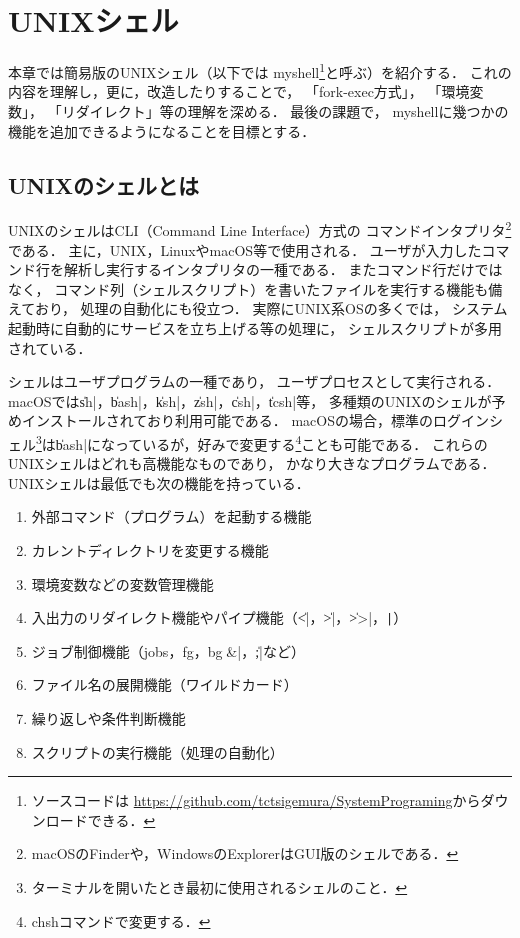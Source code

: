 \chapter{UNIXシェル}
本章では簡易版のUNIXシェル（以下では myshell\footnote{
ソースコードは
\url{https://github.com/tctsigemura/SystemPrograming}からダウンロードできる．
}と呼ぶ）を紹介する．
これの内容を理解し，更に，改造したりすることで，
「fork-exec方式」，
「環境変数」，
「リダイレクト」等の理解を深める．
最後の課題で，
myshellに幾つかの機能を追加できるようになることを目標とする．

\section{UNIXのシェルとは}
UNIXのシェルはCLI（Command Line Interface）方式の
コマンドインタプリタ\footnote{
macOSのFinderや，WindowsのExplorerはGUI版のシェルである．}である．
主に，UNIX，LinuxやmacOS等で使用される．
ユーザが入力したコマンド行を解析し実行するインタプリタの一種である．
またコマンド行だけではなく，
コマンド列（シェルスクリプト）を書いたファイルを実行する機能も備えており，
処理の自動化にも役立つ．
実際にUNIX系OSの多くでは，
システム起動時に自動的にサービスを立ち上げる等の処理に，
シェルスクリプトが多用されている．

シェルはユーザプログラムの一種であり，
ユーザプロセスとして実行される．
macOSでは\|sh|，\|bash|，\|ksh|，\|zsh|，\|csh|，\|tcsh|等，
多種類のUNIXのシェルが予めインストールされており利用可能である．
macOSの場合，標準のログインシェル\footnote{
ターミナルを開いたとき最初に使用されるシェルのこと．
}は\|bash|になっているが，好みで変更する\footnote{
chshコマンドで変更する．}ことも可能である．
これらのUNIXシェルはどれも高機能なものであり，
かなり大きなプログラムである．
UNIXシェルは最低でも次の機能を持っている．

\begin{enumerate}
\item 外部コマンド（プログラム）を起動する機能
\item カレントディレクトリを変更する機能
\item 環境変数などの変数管理機能
\item 入出力のリダイレクト機能やパイプ機能（\|<|，\|>|，\|>>|，\verb;|;）
\item ジョブ制御機能（jobs，fg，bg，\|&|，\|;|など）
\item ファイル名の展開機能（ワイルドカード）
\item 繰り返しや条件判断機能
\item スクリプトの実行機能（処理の自動化）
\end{enumerate}


